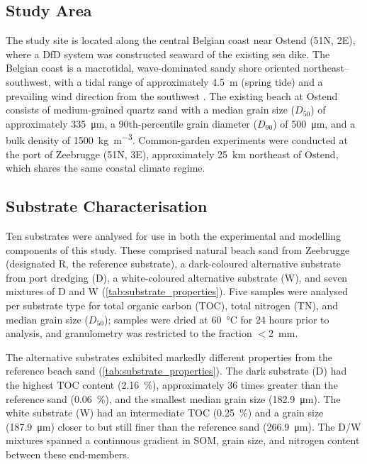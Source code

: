 \documentclass[authoryear,preprint,review,12pt]{elsarticle}
\begin{document}
\subsection{Study Area}

The study site is located along the central Belgian coast near Ostend (51\textquotesingle N, 2\textquotesingle E), where a DfD system was constructed seaward of the existing sea dike. The Belgian coast is a macrotidal, wave-dominated sandy shore oriented northeast--southwest, with a tidal range of approximately \SI{4.5}{\metre} (spring tide) and a prevailing wind direction from the southwest \citep{degraer2006belgian}. The existing beach at Ostend consists of medium-grained quartz sand with a median grain size ($D_{50}$) of approximately \SI{335}{\micro\metre}, a 90th-percentile grain diameter ($D_{90}$) of \SI{500}{\micro\metre}, and a bulk density of \SI{1500}{\kilo\gram\per\cubic\metre}. Common-garden experiments were conducted at the port of Zeebrugge (51\textquotesingle N, 3\textquotesingle E), approximately \SI{25}{\kilo\metre} northeast of Ostend, which shares the same coastal climate regime.


\subsection{Substrate Characterisation}

Ten substrates were analysed for use in both the experimental and modelling components of this study. These comprised natural beach sand from Zeebrugge (designated R, the reference substrate), a dark-coloured alternative substrate from port dredging (D), a white-coloured alternative substrate (W), and seven mixtures of D and W (\cref{tab:substrate_properties}). Five samples were analysed per substrate type for total organic carbon (TOC), total nitrogen (TN), and median grain size ($D_{50}$); samples were dried at \SI{60}{\degreeCelsius} for 24 hours prior to analysis, and granulometry was restricted to the fraction $<$\SI{2}{\milli\metre}.

The alternative substrates exhibited markedly different properties from the reference beach sand (\cref{tab:substrate_properties}). The dark substrate (D) had the highest TOC content (\SI{2.16}{\percent}), approximately 36 times greater than the reference sand (\SI{0.06}{\percent}), and the smallest median grain size (\SI{182.9}{\micro\metre}). The white substrate (W) had an intermediate TOC (\SI{0.25}{\percent}) and a grain size (\SI{187.9}{\micro\metre}) closer to but still finer than the reference sand (\SI{266.9}{\micro\metre}). The D/W mixtures spanned a continuous gradient in SOM, grain size, and nitrogen content between these end-members.
\end{document}
